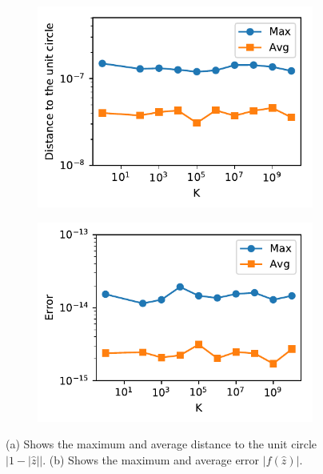 \begin{figure}[!htb]
	
	\begin{subfigure}{.5\textwidth}
		\centering

		\includegraphics[scale=.8]{figures/e3p_known_sols2}
		\caption{}
		\label{fig:e3p_known_sols2}
	\end{subfigure}
	\begin{subfigure}{.5\textwidth}
	\centering
	
	\includegraphics[scale=.8]{figures/e3p_known_sols1}
	\caption{}
	\label{fig:e3p_known_sols1}
	\end{subfigure}
\caption{(a) Shows the maximum and average distance to the unit circle $|1-|\hat{z}||$. (b) Shows the maximum and average error $|f(\hat{z})|$.}
\end{figure}

